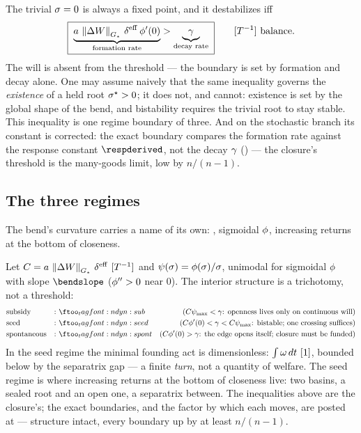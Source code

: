 \documentclass[../main]{subfiles}
\begin{document}
\begin{proposition}%
  The trivial $\sigma=0$ is always a fixed point, and it destabilizes iff
  \begin{equation}
    \boxed{\;
    \underbrace{\hingeA\,\normG{\surplus}\,\effdensity\,\bendfn'(0)}_{\text{formation rate}}
    >\underbrace{\decayrate}_{\text{decay rate}}\;}\qquad\dimrate\ \text{balance.}
    \label{eq:dyn:bif}
  \end{equation}
  The will is absent from the threshold --- the boundary is set by formation and decay alone.
  One may assume naively that the same inequality governs the \emph{existence} of a held
  root $\sigma\sp{\star}>0$; it does not, and cannot: existence is set by the global shape of
  the bend, and bistability requires the trivial root to stay stable. This
  inequality is one regime boundary of three. And on the
  stochastic branch its constant is corrected: the exact boundary compares the
  formation rate against the response constant $\respderived$, not the decay $\gamma$
  () --- the closure's threshold is the many-goods limit, low by
  $n/(n-1)$.
\end{proposition}

\subsection{The three regimes}
\label{subsec:fixed:tri}
%
The bend's curvature carries a name of its own: , sigmoidal
$\phi$, increasing returns at the bottom of closeness.

\begin{theorem}
%
  Let $C=\hingeA\,\normG{\surplus}\,\effdensity\ \dimrate$ and
  $\psi(\sigma)=\phi(\sigma)/\sigma$, unimodal for sigmoidal $\phi$ with
  slope $\bendslope$ ($\phi''>0$ near $0$). The interior structure
  is a trichotomy, not a threshold:
  \begin{align}
    &\text{subsidy} &:& \eqtag{dyn:sub}{$C\psi_{\max}<\decayrate$:
      openness lives only on continuous will}\\
    &\text{seed} &:& \eqtag{dyn:seed}{$C\bendfn'(0)<\decayrate<C\psi_{\max}$:
      bistable; one crossing suffices}\\
    &\text{spontaneous} &:& \eqtag{dyn:spont}{$C\bendfn'(0)>\decayrate$:
      the edge opens itself; closure must be funded}
  \end{align}
  In the seed regime the minimal founding act is dimensionless: $\int\omega\,dt\
  [1]$, bounded below by the separatrix gap --- a finite \emph{turn}, not a
  quantity of welfare. The seed regime is where increasing returns at the bottom of
  closeness live: two basins, a sealed root and an open one, a separatrix between.
  The inequalities above are the closure's; the exact boundaries, and the factor by
  which each moves, are posted at \ftag{dyn:response} --- structure intact, every
  boundary up by at least $n/(n-1)$.
\end{theorem}
\end{document}

